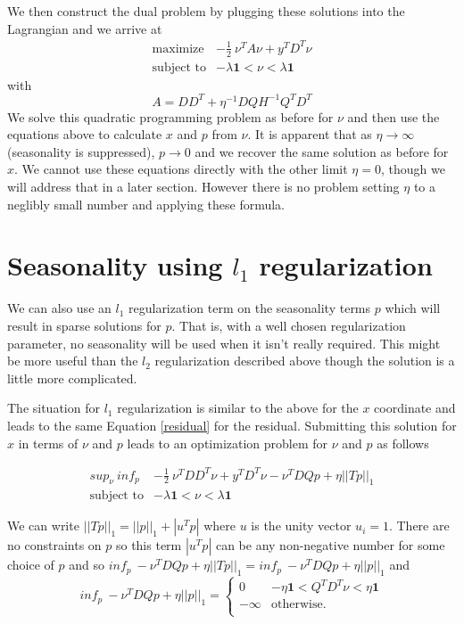 \documentclass{article}
\begin{document}
We then construct the dual problem by plugging these solutions into the Lagrangian and we arrive at
\begin{eqnarray}
\mbox{maximize} & -\frac{1}{2} ~ \nu^T A \nu + y^T D^T \nu \\
\mbox{subject to} & - \lambda \mathbf{1} < \nu < \lambda \mathbf{1}
\end{eqnarray}
with
\[
A = D D^T + \eta^{-1} D Q H^{-1} Q^T D^T
\]
We solve this quadratic programming problem as before for $\nu$ and then use the equations above
to calculate $x$ and $p$ from $\nu$. It is apparent that as $\eta \rightarrow \infty$ (seasonality is suppressed),
$p \rightarrow 0$ and we recover the same solution as before for $x$. We cannot use these equations directly with
the other limit $\eta = 0$, though we will address that in a later section. However there is no problem setting
$\eta$ to a neglibly small number and applying these formula.

\section{Seasonality using $l_1$ regularization}
We can also use an $l_1$ regularization term on the seasonality terms $p$ which will result in
sparse solutions for $p$. That is, with a well chosen regularization parameter,
no seasonality will be used when it isn't really required. This might be more useful than the $l_2$
regularization described above though the solution is a little more complicated.

The situation for $l_1$ regularization is similar to the above for the $x$ coordinate and leads to the
same Equation \ref{residual} for the residual. Submitting this solution for $x$ in terms of $\nu$ and $p$
leads to an optimization problem for $\nu$ and $p$ as follows

\begin{eqnarray}
sup_{\nu} ~ inf_p & -\frac{1}{2} ~ \nu^T D D^T \nu + y^T D^T \nu -\nu^T D Q p + \eta ||T p||_1 \\
\mbox{subject to} & - \lambda \mathbf{1} < \nu < \lambda \mathbf{1}
\end{eqnarray}

We can write $||T p||_1 = ||p||_1 + |u^T p| $ where $u$ is the unity vector $u_i=1$. There are no constraints on
$p$ so this term $|u^T p|$ can be any non-negative number for some choice of $p$ and so
$inf_{p} ~  -\nu^T D Q p + \eta ||T p||_1 = inf_{p} ~  -\nu^T D Q p + \eta ||p||_1 $ and
\[
inf_{p} ~  -\nu^T D Q p + \eta ||p||_1 =
    \left\{
    \begin{array}{ll}
    0 &  - \eta \mathbf{1} <  Q^T D^T \nu < \eta \mathbf{1} \\
  -\infty  & \mbox{otherwise.} \\
  \end{array}
  \right.
\]
\end{document}

